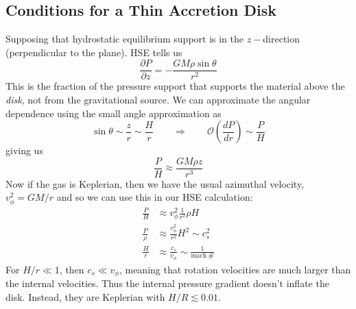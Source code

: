 \documentclass[10pt]{article}
\numberwithin{equation}{section}
\begin{document}
	\subsection{Conditions for a Thin Accretion Disk} %
	\label{sub:conditions_for_a_thin_accretion_disk}
	Supposing that hydrostatic equilibrium support is in the $z-$direction (perpendicular to the plane). HSE tells us
	\begin{equation}
		\label{eq:disk:7} \frac{\partial P}{\partial z} = -\frac{GM \rho\sin\theta}{r^2}
	\end{equation}
	This is the fraction of the pressure support that supports the material above the \emph{disk}, not from the gravitational source. We can approximate the angular dependence using the small angle approximation as
	\begin{equation}
		\label{eq:disk:8} \sin\theta \sim \frac{z}{r}\sim \frac{H}{r} \qquad \Rightarrow \qquad \mathcal{O}\left(\frac{dP}{dr}\right) \sim \frac{P}{H}
	\end{equation}
	giving us
	\begin{equation}
		\label{eq:disk:9} \frac{P}{H} \approx \frac{GM\rho z}{r^3}
	\end{equation}
	Now if the gas is Keplerian, then we have the usual azimuthal velocity, $v_\phi^2 = GM/r$ and so we can use this in our HSE calculation:
	\begin{align}
		\label{eq:disk:10} \frac{P}{H} &\approx v_\phi^2 \frac{1}{r^2} \rho H\\
		\label{eq:disk:11} \frac{P}{\rho} &\approx \frac{v_\phi^2}{r^2}H^2\sim c_s^2\\
		\label{eq:disk:12} \frac{H}{r} & \approx \frac{c_s}{v_\phi} \sim \frac{1}{\mathrm{mach\ \#}}
	\end{align}
	For $H/r\ll 1$, then $c_s \ll v_\phi$, meaning that rotation velocities are much larger than the internal velocities. Thus the internal pressure gradient doesn't inflate the disk. Instead, they are Keplerian with $H/R\lesssim 0.01$.\\
	
\end{document}
